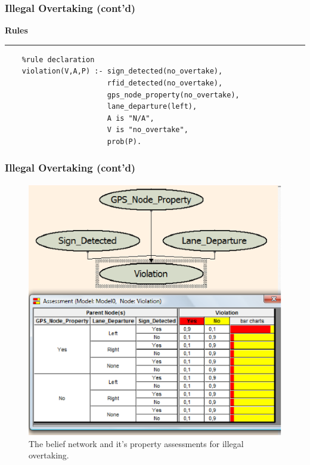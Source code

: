 \documentclass{beamer}
\newenvironment{mylisting}
{\begin{list}{}{\setlength{\leftmargin}{1em}}\item\scriptsize\bfseries}
{\end{list}}
\begin{document}
\begin{frame}[fragile]
	\frametitle{Illegal Overtaking (cont'd)}
	\begin{mylisting}
	Rules
	\vspace*{2px}\hrule
	\begin{verbatim}
	%rule declaration
	violation(V,A,P) :- sign_detected(no_overtake),
	                    rfid_detected(no_overtake),
	                    gps_node_property(no_overtake),
	                    lane_departure(left),
	                    A is "N/A",
	                    V is "no_overtake",
	                    prob(P).
	\end{verbatim}
	\end{mylisting}	
\end{frame}

\begin{frame}[fragile]
	\frametitle{Illegal Overtaking (cont'd)}
	\begin{figure}[ht]
	\begin{center}
	\includegraphics[width=.5\paperwidth]{../img/overtake_bn.eps}
	\caption{The belief network and it's property assessments for illegal overtaking.}
	\label{fig:bnillegal}
	\end{center}
	\end{figure}	
\end{frame}
\end{document}
